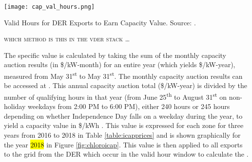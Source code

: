 \begin{conditionalfigure}[!htb]
  \centering
	  \texttt{[image: cap\_val\_hours.png]}
	  \caption{Valid Hours for DER Exports to Earn Capacity Value. Source: \citet{nypsc_matter_2019}.}
	  \label{fig:capvalheatmap}
\end{conditionalfigure}


\vspace*{10mm}
\begin{centering}
\large\textsc{which method is this in the vder stack \ldots}
\end{centering}
\vspace*{10mm}

The specific value is calculated by taking the sum of the monthly capacity auction results (in \$/kW-month) for an entire year (which yields \$/kW-year), measured from May 31\textsuperscript{st} to May 31\textsuperscript{st}. The monthly capacity auction results can be accessed at \cite{nyiso_monthly_2020}. This annual capacity auction total (\$/kW-year) is divided by the number of qualifying hours in that year (from June 25\textsuperscript{th} to August 31\textsuperscript{st} on non-holiday weekdays from 2:00 PM to 6:00 PM), either 240 hours or 245 hours depending on whether Independence Day falls on a weekday during the year, to yield a capacity value in \$/kWh \cite{nypsc_matter_2019}. This value is expressed for each zone for three years from 2016 to 2018 in Table \ref{table:icapprices} and is shown graphically for the year \hl{2018} in Figure \ref{fig:chloroicap}. This value is then applied to all exports to the grid from the DER which occur in the valid hour window to calculate the \aciv{}. 



